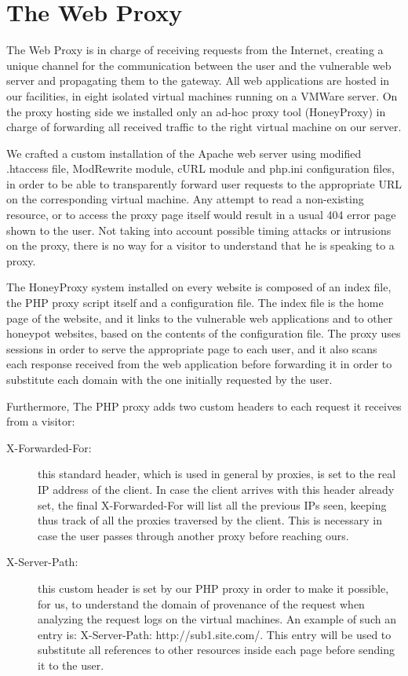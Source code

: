 \section{The Web Proxy}

The Web Proxy is in charge of receiving requests from the Internet, creating a unique channel for the communication between the user and the vulnerable web server and propagating them to the gateway.
All web applications are hosted in our facilities, in eight isolated virtual machines running on a VMWare server. On the proxy hosting side we installed only an ad-hoc proxy tool (HoneyProxy) in charge of forwarding all received traffic to the right virtual machine on our server.

We crafted a custom installation of the Apache web server using modified .htaccess file, ModRewrite module, cURL module and php.ini configuration files, in order to be able to transparently forward user requests to the appropriate URL on the corresponding virtual machine. Any attempt to read a non-existing resource, or to access the proxy page itself would result in a usual 404 error page shown to the user. Not taking into account possible timing attacks or intrusions on the proxy, there is no way for a visitor to understand that he is speaking to a proxy.

The HoneyProxy system installed on every website is composed of an index file, the PHP proxy script itself and a configuration file. The index file is the home page of the website, and it links to the vulnerable web applications and to other honeypot websites, based on the contents of the configuration file. The proxy uses sessions in order to serve the appropriate page to each user, and it also scans each response received from the web application before forwarding it in order to substitute each domain with the one initially requested by the user.

Furthermore, The PHP proxy adds two custom headers to each request it receives from a visitor:

\begin{description}
\item[X-Forwarded-For: ] this standard header, which is used in general by proxies, is set to the real IP address of the client. In case the client arrives with this header already set, the final X-Forwarded-For will list all the previous IPs seen, keeping thus track of all the proxies traversed by the client. This is necessary in case the user passes through another proxy before reaching ours.

\item[X-Server-Path: ] this custom header is set by our PHP proxy in order to make it possible, for us, to understand the domain of provenance of the request when analyzing the request logs on the virtual machines. An example of such an entry is: X-Server-Path: http://sub1.site.com/. This entry will be used to substitute all references to other resources inside each page before sending it to the user.
\end{description}

